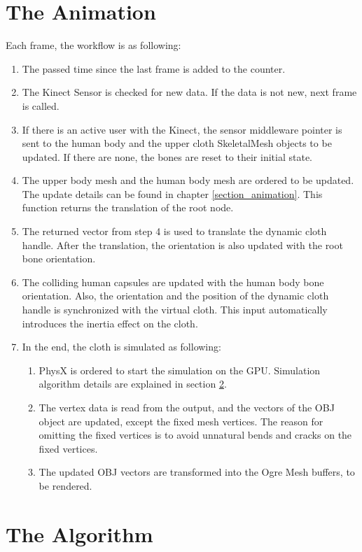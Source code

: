 \section{The Animation}
Each frame, the workflow is as following:
\begin{enumerate}
\item The passed time since the last frame is added to the counter.
\item The Kinect Sensor is checked for new data. If the data is not new, next frame is called. 
\item If there is an active user with the Kinect, the sensor middleware pointer is sent to the human body and the upper cloth SkeletalMesh objects to be updated. If there are none, 
the bones are reset to their initial state.
\item The upper body mesh and the human body mesh are ordered to be updated. The update details can be found in chapter \ref{section_animation}. 
This function returns the translation of the root node. 
\item The returned vector from step 4 is used to translate the dynamic cloth handle. After the translation, the orientation is also updated with the root bone orientation.
\item The colliding human capsules are updated with the human body bone orientation. Also, the orientation and the position of the dynamic cloth handle is synchronized with 
the virtual cloth. This input automatically introduces the inertia effect on the cloth.
\item In the end, the cloth is simulated as following:
\begin{enumerate}
  \item PhysX is ordered to start the simulation on the GPU. Simulation algorithm details are explained in section \ref{section_cloth_simulation_algorithm}.
  \item The vertex data is read from the output, and the vectors of the OBJ object are updated, except the fixed mesh vertices. The reason for omitting the fixed vertices
   is to avoid unnatural bends and cracks on the fixed vertices.
  \item The updated OBJ vectors are transformed into the Ogre Mesh buffers, to be rendered. 
\end{enumerate}
\end{enumerate}

\section{The Algorithm}
\label{section_cloth_simulation_algorithm}

